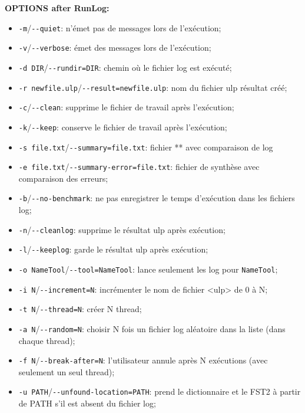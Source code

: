 \bigskip
\noindent \textbf{OPTIONS after RunLog:}
\begin{itemize}
  \item \verb+-m+/\verb+--quiet+: n'émet pas de messages lors de l'exécution;
  \item \verb+-v+/\verb+--verbose+: émet des messages lors de l'exécution;
  
  \item \verb+-d DIR+/\verb+--rundir=DIR+: chemin où le fichier log est exécuté;
  \item \verb+-r newfile.ulp+/\verb+--result=newfile.ulp+: nom du fichier ulp résultat créé;

  \item \verb+-c+/\verb+--clean+: supprime le fichier de travail après l'exécution;
  \item \verb+-k+/\verb+--keep+: conserve le fichier de travail après l'exécution;

  \item \verb+-s file.txt+/\verb+--summary=file.txt+: fichier ** avec comparaison de log
  \item \verb+-e file.txt+/\verb+--summary-error=file.txt+: fichier de synthèse avec comparaison des
  	  erreurs;

  \item \verb+-b+/\verb+--no-benchmark+: ne pas enregistrer le temps d'exécution dans les fichiers
  	  log;

  \item \verb+-n+/\verb+--cleanlog+: supprime le résultat ulp après exécution;
  \item \verb+-l+/\verb+--keeplog+: garde le résultat ulp après exécution;

  \item \verb+-o NameTool+/\verb+--tool=NameTool+: lance seulement les log pour \verb+NameTool+;
  \item \verb+-i N+/\verb+--increment=N+: incrémenter le nom de fichier <ulp> de  0 à N;
  \item \verb+-t N+/\verb+--thread=N+: créer N thread;
  \item \verb+-a N+/\verb+--random=N+: choisir N fois un fichier log aléatoire dans la liste (dans chaque thread);
  \item \verb+-f N+/\verb+--break-after=N+: l'utilisateur annule après N exécutions (avec seulement un seul thread);

  \item \verb+-u PATH+/\verb+--unfound-location=PATH+: prend le dictionnaire et le FST2 à partir de  PATH s'il est absent du fichier log;
\end{itemize}


